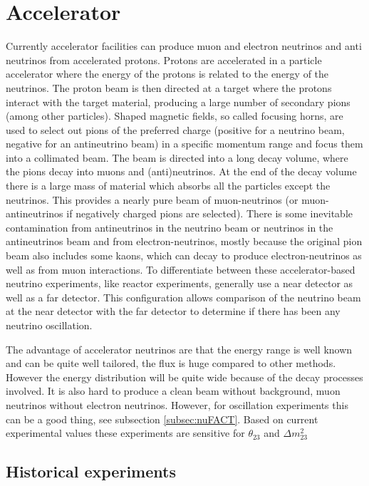 \section{Accelerator}
Currently accelerator facilities can produce muon and electron neutrinos and anti neutrinos from accelerated protons. Protons are accelerated in a particle accelerator where the energy of the protons is related to the energy of the neutrinos. The proton beam is then directed at a target where the protons interact with the target material, producing a large number of secondary pions (among other particles). Shaped magnetic fields, so called focusing horns, are used to select out pions of the preferred charge (positive for a neutrino beam, negative for an antineutrino beam) in a specific momentum range and focus them into a collimated beam. The beam is directed into a long decay volume, where the pions decay into muons and (anti)neutrinos. At the end of the decay volume there is a large mass of material which absorbs all the particles except the neutrinos. This provides a nearly pure beam of muon-neutrinos (or muon-antineutrinos if negatively charged pions are selected). There is some inevitable contamination from antineutrinos in the neutrino beam or neutrinos in the antineutrinos beam and from electron-neutrinos, mostly because the original pion beam also includes some kaons, which can decay to produce electron-neutrinos as well as from muon interactions. To differentiate between these accelerator-based neutrino experiments, like reactor experiments, generally use a near detector as well as a far detector. This configuration allows comparison of the neutrino beam at the near detector with the far detector to determine if there has been any neutrino oscillation.

The advantage of accelerator neutrinos are that the energy range is well known and can be quite well tailored, the flux is huge compared to other methods. However the energy distribution will be quite wide because of the decay processes involved. It is also hard to produce a clean beam without background, muon neutrinos without electron neutrinos. However, for oscillation experiments this can be a good thing, see subsection \ref{subsec:nuFACT}. Based on current experimental values these experiments are sensitive for $\theta_{23}$ and $\Delta m_{23}^2 $

\subsection{Historical experiments}

